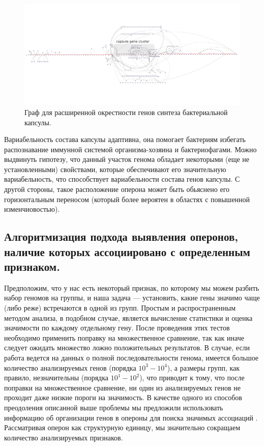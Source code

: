 \begin{figure}[!ht] 
  \center
    \includegraphics[width=\textwidth]{Dissertation/images/subgraphs/capsular_subgraph.pdf}
  \caption{Граф для расширенной окрестности генов синтеза бактериальной капсулы. }
  \label{img:capsule_sub_large} 
\end{figure}

Вариабельность состава капсулы адаптивна, она помогает бактериям избегать распознавание иммунной системой организма-хозяина и бактериофагами. Можно выдвинуть гипотезу, что данный участок генома обладает некоторыми (еще не установленными) свойствами, которые обеспечивают его значительную вариабельность, что способствует вариабельности состава генов капсулы. С другой стороны, такое расположение оперона может быть обьяснено его горизонтальным переносом (который более вероятен в областях с повышенной изменчиовостью).



\subsection*{Алгоритмизация подхода выявления оперонов, наличие которых ассоциировано с определенным признаком. } \label{chaptOperons}

Предположим, что у нас есть некоторый признак, по которому мы можем разбить набор геномов на группы, и наша задача --- установить, какие гены значимо чаще (либо реже) встречаются в одной из групп. Простым и распространенным методом анализа, в подобном случае, является вычисление статистики и оценка значимости по каждому отдельному гену. После проведения этих тестов необходимо применить поправку на множественное сравнение, так как иначе следует ожидать множество ложно положительных результатов. В случае, если работа ведется на данных о полной последовательности генома, имеется большое количество анализируемых генов (порядка $10^3 - 10^4$), а размеры групп, как правило, незначительны (порядка $10^1 - 10^2$), что приводит к тому, что после поправки на множественное сравнение, ни один из анализируемых генов не проходит даже низкие пороги на значимость. В качестве одного из способов преодоления описанной выше проблемы мы предложили использовать информацию об организации генов в опероны для поиска значимых ассоциаций \cite{rakitina2017genome}. Рассматривая оперон как структурную единицу, мы значительно сокращаем количество анализируемых признаков.


